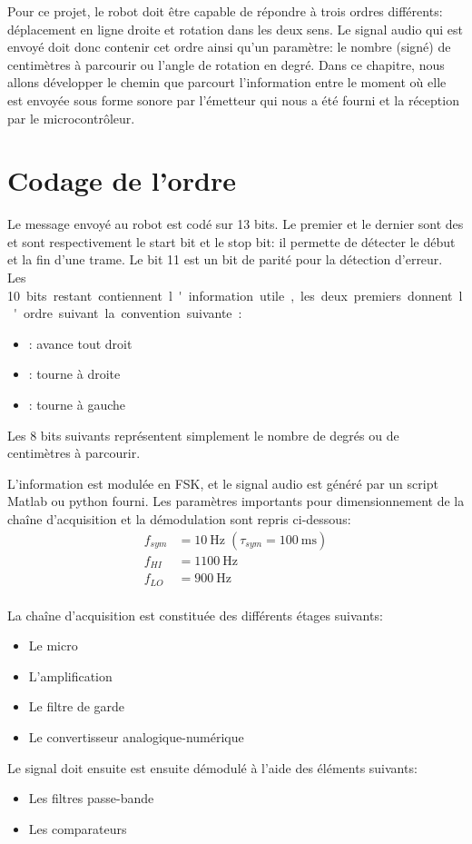 Pour ce projet, le robot doit être capable de répondre à trois ordres différents: déplacement en ligne droite et rotation dans les deux sens. Le signal audio qui est envoyé doit donc contenir cet ordre ainsi qu'un paramètre: le nombre (signé) de centimètres à parcourir ou l'angle de rotation en degré. Dans ce chapitre, nous allons développer le chemin que parcourt l'information entre le moment où elle est envoyée sous forme sonore par l'émetteur qui nous a été fourni et la réception par le microcontrôleur.

\section{Codage de l'ordre}
Le message envoyé au robot est codé sur 13 bits. Le premier et le dernier sont des et sont respectivement le start bit et le stop bit: il permette de détecter le début et la fin d'une trame. Le bit 11 est un bit de parité pour la détection d'erreur. Les \SI{10} bits restant contiennent l'information utile, les deux premiers donnent l'ordre suivant la convention suivante :
\begin{itemize}
\item {} : avance tout droit
\item {} : tourne à droite
\item {} : tourne à gauche
\end{itemize}
Les 8 bits suivants représentent simplement le nombre de degrés ou de centimètres à parcourir.

L'information est modulée en FSK, et le signal audio est généré par un script Matlab ou python fourni. Les paramètres importants pour dimensionnement de la chaîne d'acquisition et la démodulation sont repris ci-dessous:
\begin{align*}
f_{sym} &= \SI{10}{\hertz} \;(\tau_{sym} = \SI{100}{\milli\second})\\
f_{HI} &= \SI{1100}{\hertz}\\
f_{LO} &= \SI{900}{\hertz}\\
\end{align*}

La chaîne d'acquisition est constituée des différents étages suivants:
\begin{itemize}
\item Le micro
\item L'amplification
\item Le filtre de garde
\item Le convertisseur analogique-numérique
\end{itemize}
Le signal doit ensuite est ensuite démodulé à l'aide des éléments suivants:
\begin{itemize}
\item Les filtres passe-bande
\item Les comparateurs
\end{itemize}

